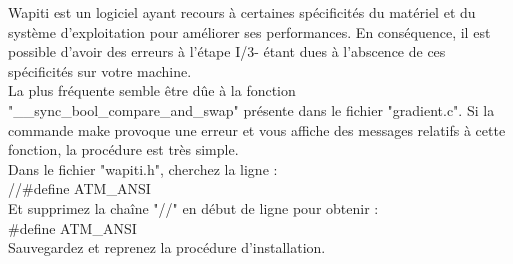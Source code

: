 \documentclass[manual-fr.tex]{subfiles}
\begin{document}
Wapiti est un logiciel ayant recours à certaines spécificités du matériel et
du système d'exploitation pour améliorer ses performances. En conséquence, il
est possible d'avoir des erreurs à l'étape I/3- étant dues à l'abscence de ces
spécificités sur votre machine.\\

La plus fréquente semble être dûe à la fonction "\_\_sync\_bool\_compare\_and\_swap"
présente dans le fichier "gradient.c". Si la commande make provoque une erreur
et vous affiche des messages relatifs à cette fonction, la procédure est très
simple.\\

Dans le fichier "wapiti.h", cherchez la ligne :\\
//\#define ATM\_ANSI\\
Et supprimez la chaîne "//" en début de ligne pour obtenir :\\
\#define ATM\_ANSI\\
Sauvegardez et reprenez la procédure d'installation.
\end{document}
